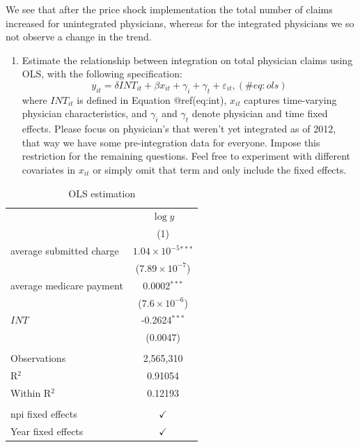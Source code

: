 \documentclass[
  12pt,
]{article}
\providecommand{\tightlist}{%
  \setlength{\itemsep}{0pt}\setlength{\parskip}{0pt}}
\begin{document}
We see that after the price shock implementation the total number of
claims increased for unintegrated physicians, whereas for the integrated
physicians we so not observe a change in the trend.

\begin{enumerate}
\def\labelenumi{\arabic{enumi}.}
\setcounter{enumi}{2}
\tightlist
\item
  Estimate the relationship between integration on total physician
  claims using OLS, with the following specification: \begin{equation}
   y_{it} = \delta INT_{it} + \beta x_{it} + \gamma_{i} + \gamma_{t} + \varepsilon_{it}, 
   (\#eq:ols)
   \end{equation} where \(INT_{it}\) is defined in Equation
  @ref(eq:int), \(x_{it}\) captures time-varying physician
  characteristics, and \(\gamma_{i}\) and \(\gamma_{t}\) denote
  physician and time fixed effects. Please focus on physician's that
  weren't yet integrated as of 2012, that way we have some
  pre-integration data for everyone. Impose this restriction for the
  remaining questions. Feel free to experiment with different covariates
  in \(x_{it}\) or simply omit that term and only include the fixed
  effects.
\end{enumerate}

\begin{table}[ht]
\centering
\begin{tabular}{lc}
   \toprule
                                      & $\log y$\\   
                                      & (1)\\  
   \midrule 
   average submitted charge      & $1.04\times 10^{-5}$$^{***}$\\    
                                      & ($7.89\times 10^{-7}$)\\    
   average medicare payment    & 0.0002$^{***}$\\   
                                      & ($7.6\times 10^{-6}$)\\    
   $INT$                                & -0.2624$^{***}$\\   
                                      & (0.0047)\\   
    \\
   Observations                       & 2,565,310\\  
   R$^2$                              & 0.91054\\  
   Within R$^2$                       & 0.12193\\  
    \\
   npi fixed effects                  & $\checkmark$\\   
   Year fixed effects                 & $\checkmark$\\   
   \bottomrule
\end{tabular}
\caption{OLS estimation} 
\end{table}
\end{document}
